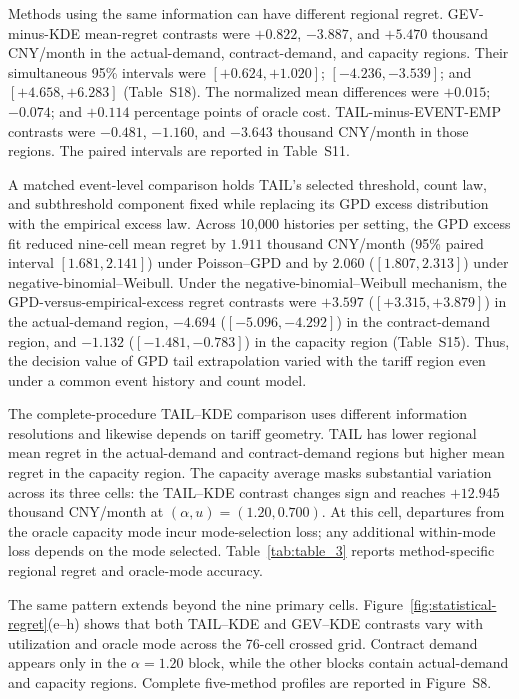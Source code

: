 \documentclass[suppldata]{interact}
\begin{document}
Methods using the same information can have different regional regret.
GEV-minus-KDE mean-regret contrasts were $+0.822$, $-3.887$, and $+5.470$ thousand CNY/month in the actual-demand,
contract-demand, and capacity regions. Their simultaneous 95\%
intervals were $[+0.624, +1.020]$; $[-4.236, -3.539]$; and $[+4.658, +6.283]$ (Table~S18). The normalized
mean differences were $+0.015$; $-0.074$; and $+0.114$ percentage points of oracle cost.
TAIL-minus-EVENT-EMP contrasts
were $-0.481$, $-1.160$, and $-3.643$ thousand CNY/month in those regions. The paired
intervals are reported in Table~S11.

A matched event-level comparison holds TAIL's selected threshold,
count law, and subthreshold component fixed while replacing its GPD
excess distribution with the empirical excess law. Across 10,000
histories per setting, the GPD excess fit reduced nine-cell mean regret
by $1.911$ thousand CNY/month (95\% paired interval
$[1.681,2.141]$) under Poisson--GPD and by $2.060$
($[1.807,2.313]$) under negative-binomial--Weibull. Under the
negative-binomial--Weibull mechanism, the GPD-versus-empirical-excess
regret contrasts were $+3.597$ ($[+3.315,+3.879]$) in the
actual-demand region, $-4.694$ ($[-5.096,-4.292]$) in the
contract-demand region, and $-1.132$ ($[-1.481,-0.783]$) in the
capacity region (Table~S15). Thus, the decision value of GPD tail
extrapolation varied with the tariff region even under a common event
history and count model.

The complete-procedure TAIL--KDE comparison uses different information
resolutions and likewise depends on tariff geometry. TAIL has lower
regional mean regret in the actual-demand
and contract-demand regions but higher mean regret in the capacity
region. The capacity average masks substantial variation across its
three cells: the TAIL--KDE contrast changes sign and reaches
$+12.945$ thousand CNY/month at
$(\alpha,u)=(1.20,0.700)$. At this cell, departures from the oracle capacity mode incur
mode-selection loss; any additional within-mode loss depends on the
mode selected. Table~\ref{tab:table_3} reports method-specific
regional regret and oracle-mode accuracy.

The same pattern extends beyond the nine primary cells.
Figure~\ref{fig:statistical-regret}(e--h) shows that both
TAIL--KDE and GEV--KDE contrasts vary with utilization and oracle mode
across the 76-cell crossed grid. Contract demand appears only in the
$\alpha=1.20$ block, while the other blocks contain actual-demand and
capacity regions. Complete five-method profiles are reported in
Figure~S8.
\end{document}
